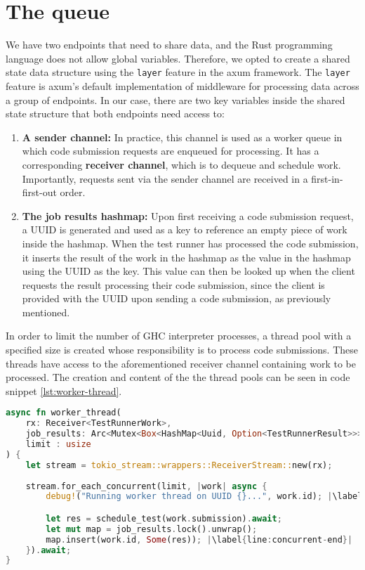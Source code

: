 \section{The queue}
We have two endpoints that need to share data, and the Rust programming language does not allow global variables.
Therefore, we opted to create a shared state data structure using the \texttt{layer} feature in the axum framework.
The \texttt{layer} feature is axum's default implementation of middleware for processing data across a group of endpoints.
In our case, there are two key variables inside the shared state structure that both endpoints need access to:
\begin{enumerate}
    \item \textbf{A sender channel:} In practice, this channel is used as a worker queue in which code submission requests are enqueued for processing. It has a corresponding \textbf{receiver channel}, which is to dequeue and schedule work. Importantly, requests sent via the sender channel are received in a first-in-first-out order.
    \item \textbf{The job results hashmap:} Upon first receiving a code submission request, a UUID is generated and used as a key to reference an empty piece of work inside the hashmap. When the test runner has processed the code submission, it inserts the result of the work in the hashmap as the value in the hashmap using the UUID as the key. This value can then be looked up when the client requests the result processing their code submission, since the client is provided with the UUID upon sending a code submission, as previously mentioned.
\end{enumerate}

In order to limit the number of GHC interpreter processes, a thread pool with a specified size is created whose responsibility is to process code submissions.
These threads have access to the aforementioned receiver channel containing work to be processed.
The creation and content of the the thread pools can be seen in code snippet \ref{lst:worker-thread}.

\begin{lstlisting}[language=rust, escapechar=|, caption={Rust code showing allocation of thread pools and scheduling of code submission processing.}, label={lst:worker-thread}]
async fn worker_thread(
    rx: Receiver<TestRunnerWork>,
    job_results: Arc<Mutex<Box<HashMap<Uuid, Option<TestRunnerResult>>>>>,
    limit : usize
) {
    let stream = tokio_stream::wrappers::ReceiverStream::new(rx);
    
    stream.for_each_concurrent(limit, |work| async {
        debug!("Running worker thread on UUID {}...", work.id); |\label{line:concurrent-start}|

        let res = schedule_test(work.submission).await;
        let mut map = job_results.lock().unwrap();
        map.insert(work.id, Some(res)); |\label{line:concurrent-end}|
    }).await;
}
\end{lstlisting}

